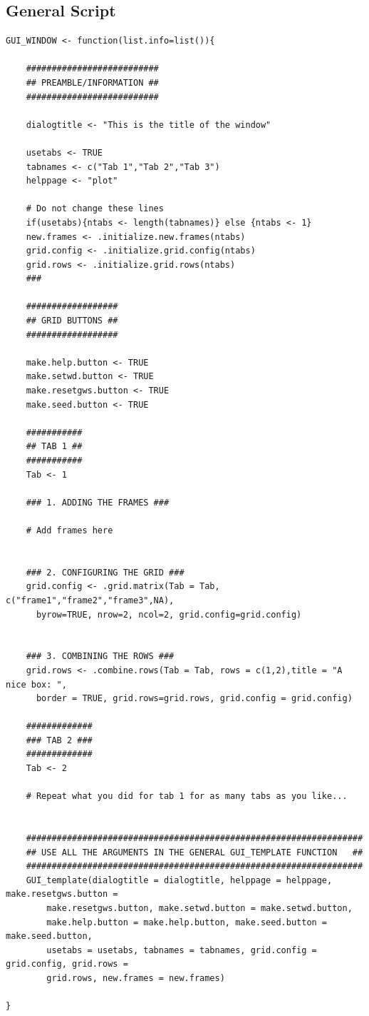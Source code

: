 \documentclass[a4paper]{article}\usepackage[]{graphicx}\usepackage[]{color}
\begin{document}
\subsection{General Script}
\begin{verbatim}
GUI_WINDOW <- function(list.info=list()){
	
    ##########################
    ## PREAMBLE/INFORMATION ##
    ##########################
	
    dialogtitle <- "This is the title of the window"

    usetabs <- TRUE
    tabnames <- c("Tab 1","Tab 2","Tab 3")
    helppage <- "plot" 
	
    # Do not change these lines
    if(usetabs){ntabs <- length(tabnames)} else {ntabs <- 1}
    new.frames <- .initialize.new.frames(ntabs)
    grid.config <- .initialize.grid.config(ntabs)
    grid.rows <- .initialize.grid.rows(ntabs)
    ###
	
    ##################
    ## GRID BUTTONS ##
    ##################
	
    make.help.button <- TRUE
    make.setwd.button <- TRUE
    make.resetgws.button <- TRUE
    make.seed.button <- TRUE

    ###########
    ## TAB 1 ##
    ###########
    Tab <- 1

    ### 1. ADDING THE FRAMES ###
	
    # Add frames here
	

    ### 2. CONFIGURING THE GRID ###
    grid.config <- .grid.matrix(Tab = Tab, c("frame1","frame2","frame3",NA),
      byrow=TRUE, nrow=2, ncol=2, grid.config=grid.config)


    ### 3. COMBINING THE ROWS ###
    grid.rows <- .combine.rows(Tab = Tab, rows = c(1,2),title = "A nice box: ",
      border = TRUE, grid.rows=grid.rows, grid.config = grid.config)
	
    #############
    ### TAB 2 ###
    #############
    Tab <- 2

    # Repeat what you did for tab 1 for as many tabs as you like...
	
	
    ##################################################################
    ## USE ALL THE ARGUMENTS IN THE GENERAL GUI_TEMPLATE FUNCTION   ##
    ##################################################################
    GUI_template(dialogtitle = dialogtitle, helppage = helppage, make.resetgws.button =
        make.resetgws.button, make.setwd.button = make.setwd.button,
        make.help.button = make.help.button, make.seed.button = make.seed.button,
        usetabs = usetabs, tabnames = tabnames, grid.config = grid.config, grid.rows =
        grid.rows, new.frames = new.frames)
	
}
\end{verbatim}
\end{document}
